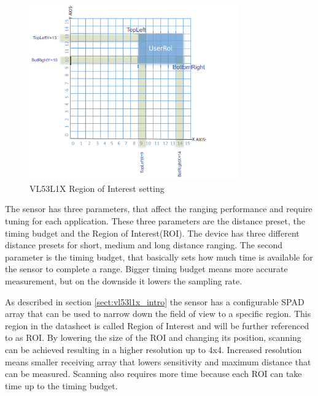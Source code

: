 \begin{figure}[!hb]
    \centering
    \includegraphics[width=90mm, keepaspectratio]{figures/vl53l1x_roi_setup.png}
    \caption{VL53L1X Region of Interest setting \cite{VL53L1XApplicationNote}}
    \label{fig:vl53l1x_roi_setup}
\end{figure}

The sensor has three parameters, that affect the ranging performance and require tuning for each application. 
These three parameters are the distance preset, the timing budget and the Region of Interest(ROI). The device 
has three different distance presets for short, medium and long distance ranging. The second parameter is the
timing budget, that basically sets how much time is available for the sensor to complete a range. Bigger 
timing budget means more accurate measurement, but on the downside it lowers the sampling rate.

As described in section \ref{sect:vl53l1x_intro} the sensor has a configurable SPAD array that can be used to 
narrow down the field of view to a specific region. This region in the datasheet is called Region of Interest
and will be further referenced to as ROI. By lowering the size of the ROI and changing its position, scanning 
can be achieved resulting in a higher resolution up to 4x4. Increased resolution means smaller receiving array 
that lowers sensitivity and maximum distance that can be measured. Scanning also requires more time because 
each ROI can take time up to the timing budget.

